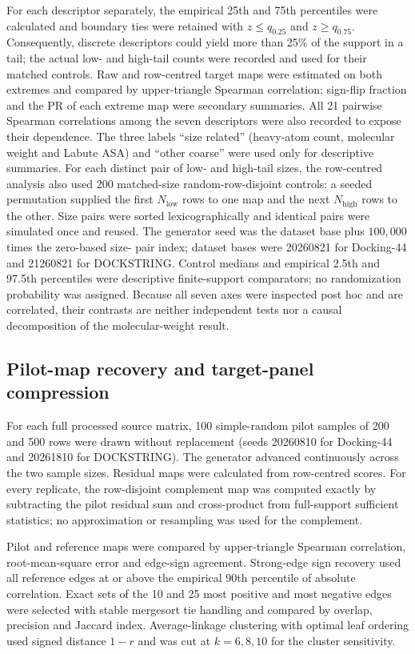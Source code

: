 For each descriptor separately, the empirical 25th and 75th percentiles were
calculated and boundary ties were retained with $z\leq q_{0.25}$ and
$z\geq q_{0.75}$.  Consequently, discrete descriptors could yield more than
25\% of the support in a tail; the actual low- and high-tail counts were
recorded and used for their matched controls.  Raw and row-centred target maps
were estimated on both extremes and compared by upper-triangle Spearman
correlation; sign-flip fraction and the PR of each extreme map were secondary
summaries.  All 21
pairwise Spearman correlations among the seven descriptors were also recorded
to expose their dependence.  The three labels ``size related'' (heavy-atom
count, molecular weight and Labute ASA) and ``other coarse'' were used only for
descriptive summaries.  For each distinct pair of low- and high-tail sizes, the
row-centred analysis also used 200 matched-size random-row-disjoint controls:
a seeded permutation supplied the first $N_{\mathrm{low}}$ rows to one map and
the next $N_{\mathrm{high}}$ rows to the other.  Size pairs were sorted
lexicographically and identical pairs were simulated once and reused.  The
generator seed was the dataset base plus $100{,}000$ times the zero-based size-
pair index; dataset bases were 20260821 for Docking-44 and 21260821 for
DOCKSTRING.  Control medians and empirical 2.5th and 97.5th percentiles were
descriptive finite-support comparators; no randomization probability was
assigned.  Because all seven axes were inspected post hoc and are correlated,
their contrasts are neither independent tests nor a causal decomposition of
the molecular-weight result.

\subsection{Pilot-map recovery and target-panel compression}

For each full processed source matrix, 100 simple-random pilot samples of 200
and 500 rows were drawn without replacement (seeds 20260810 for Docking-44 and
20261810 for DOCKSTRING).  The generator advanced continuously across the two
sample sizes.  Residual maps were calculated from row-centred scores.  For every
replicate, the row-disjoint complement map was computed exactly by subtracting
the pilot residual sum and cross-product from full-support sufficient
statistics; no approximation or resampling was used for the complement.

Pilot and reference maps were compared by upper-triangle Spearman correlation,
root-mean-square error and edge-sign agreement.  Strong-edge sign recovery used
all reference edges at or above the empirical 90th percentile of absolute
correlation.  Exact sets of the 10 and 25 most positive and most negative edges
were selected with stable mergesort tie handling and compared by overlap,
precision and Jaccard index.  Average-linkage clustering with optimal leaf
ordering used signed distance $1-r$ and was cut at $k=6,8,10$ for the cluster
sensitivity.


